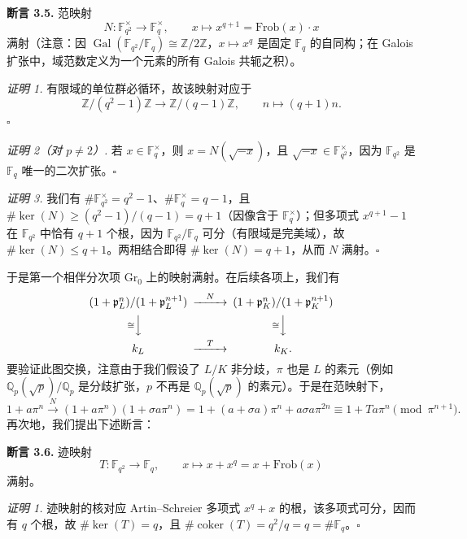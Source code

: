 \textbf{断言 3.5.} 范映射
\[
  N\colon\mathbb{F}_{q^2}^{\times}\to\mathbb{F}_q^{\times},\qquad x\mapsto x^{q+1}=\mathrm{Frob}(x)\cdot x
\]
满射（注意：因 $\operatorname{Gal}(\mathbb{F}_{q^2}/\mathbb{F}_q)\cong\mathbb{Z}/2\mathbb{Z}$，$x\mapsto x^q$ 是固定 $\mathbb{F}_q$ 的自同构；在 Galois 扩张中，域范数定义为一个元素的所有 Galois 共轭之积）。

\textit{证明 1.} 有限域的单位群必循环，故该映射对应于
\[
  \mathbb{Z}/(q^2-1)\mathbb{Z}\to\mathbb{Z}/(q-1)\mathbb{Z},\qquad n\mapsto(q+1)n.
\]
\hfill$\square$

\textit{证明 2（对 $p\neq 2$）.} 若 $x\in\mathbb{F}_q^{\times}$，则 $x=N(\sqrt{-x})$，且 $\sqrt{-x}\in\mathbb{F}_{q^2}^{\times}$，因为 $\mathbb{F}_{q^2}$ 是 $\mathbb{F}_q$ 唯一的二次扩张。\hfill$\square$

\textit{证明 3.} 我们有 $\#\mathbb{F}_{q^2}^{\times}=q^2-1$、$\#\mathbb{F}_q^{\times}=q-1$，且 $\#\ker(N)\geq(q^2-1)/(q-1)=q+1$（因像含于 $\mathbb{F}_q^{\times}$）；但多项式 $x^{q+1}-1$ 在 $\mathbb{F}_{q^2}$ 中恰有 $q+1$ 个根，因为 $\mathbb{F}_{q^2}/\mathbb{F}_q$ 可分（有限域是完美域），故 $\#\ker(N)\leq q+1$。两相结合即得 $\#\ker(N)=q+1$，从而 $N$ 满射。\hfill$\square$

于是第一个相伴分次项 $\mathrm{Gr}_0$ 上的映射满射。在后续各项上，我们有
\[
  \begin{CD}
    (1+\mathfrak{p}_L^n)/(1+\mathfrak{p}_L^{n+1}) @>{N}>> (1+\mathfrak{p}_K^n)/(1+\mathfrak{p}_K^{n+1})\\
    @V{\cong}VV @V{\cong}VV\\
    k_L @>{T}>> k_K.
  \end{CD}
\]
要验证此图交换，注意由于我们假设了 $L/K$ 非分歧，$\pi$ 也是 $L$ 的素元（例如 $\mathbb{Q}_p(\sqrt{p})/\mathbb{Q}_p$ 是分歧扩张，$p$ 不再是 $\mathbb{Q}_p(\sqrt{p})$ 的素元）。于是在范映射下，
\[
  1+a\pi^n\xrightarrow{\ N\ }(1+a\pi^n)(1+\sigma a\pi^n)
  =1+(a+\sigma a)\pi^n+a\sigma a\pi^{2n}
  \equiv 1+Ta\pi^n \pmod{\pi^{n+1}}.
\]
再次地，我们提出下述断言：

\textbf{断言 3.6.} 迹映射
\[
  T\colon\mathbb{F}_{q^2}\to\mathbb{F}_q,\qquad x\mapsto x+x^q=x+\mathrm{Frob}(x)
\]
满射。

\textit{证明 1.} 迹映射的核对应 Artin--Schreier 多项式 $x^q+x$ 的根，该多项式可分，因而有 $q$ 个根，故 $\#\ker(T)=q$，且 $\#\operatorname{coker}(T)=q^2/q=q=\#\mathbb{F}_q$。\hfill$\square$


